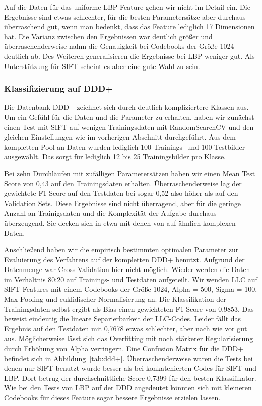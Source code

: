 Auf die Daten für das uniforme LBP-Feature gehen wir nicht im Detail ein. Die Ergebnisse sind etwas schlechter, für die besten Parametersätze aber durchaus überraschend gut, wenn man bedenkt, dass das Feature lediglich 17 Dimensionen hat. Die Varianz zwischen den Ergebnissen war deutlich größer und überraschenderweise nahm die Genauigkeit bei Codebooks der Größe 1024 deutlich ab. Des Weiteren generalisieren die Ergebnisse bei LBP weniger gut. Als Unterstützung für SIFT scheint es aber eine gute Wahl zu sein.

\subsubsection{Klassifizierung auf DDD+}

Die Datenbank DDD+ zeichnet sich durch deutlich kompliziertere Klassen aus. Um ein Gefühl für die Daten und die Parameter zu erhalten. haben wir zunächst einen Test mit SIFT auf wenigen Trainingsdaten mit RandomSearchCV und den gleichen Einstellungen wie im vorherigen Abschnitt durchgeführt. Aus dem kompletten Pool an Daten wurden lediglich 100 Trainings- und 100 Testbilder ausgewählt. Das sorgt für lediglich 12 bis 25 Trainingsbilder pro Klasse.

Bei zehn Durchläufen mit zufälligen Parametersätzen haben wir einen Mean Test Score von 0,43 auf den Trainingsdaten erhalten. Überraschenderweise lag der gewichtete F1-Score auf den Testdaten bei sogar 0,52 also höher als auf den Validation Sets. Diese Ergebnisse sind nicht überragend, aber für die geringe Anzahl an Trainigsdaten und die Komplexität der Aufgabe durchaus überzeugend. Sie decken sich in etwa mit denen von \cite{wyylhg10} auf ähnlich komplexen Daten.

Anschließend haben wir die empirisch bestimmten optimalen Parameter zur Evaluierung des Verfahrens auf der kompletten DDD+ benutzt. Aufgrund der Datenmenge war Cross Validation hier nicht möglich. Wieder werden die Daten im Verhältnis 80:20 auf Trainings- und Testdaten aufgeteilt. Wir wenden LLC auf SIFT-Features mit einem Codebooks der Größe 1024, Alpha = 500, Sigma = 100, Max-Pooling und euklidischer Normalisierung an. Die Klassifikation der Trainingsdaten selbst ergibt als Bias einen gewichteten F1-Score von 0,9853. Das beweist eindeutig die lineare Separierbarkeit der LLC-Codes. Leider fällt das Ergebnis auf den Testdaten mit 0,7678 etwas schlechter, aber nach wie vor gut aus. Möglicherweise lässt sich das Overfitting mit noch stärkerer Regularisierung durch Erhöhung von Alpha verringern. Eine Confusion Matrix für die DDD+ befindet sich in Abbildung~\ref{tab:ddd+}. Überraschenderweise waren die Tests bei denen nur SIFT benutzt wurde besser als bei konkatenierten Codes für SIFT und LBP. Dort betrug der durchschnittliche Score 0,7399 für den besten Klassifikator. Wie bei den Tests von LBP auf der DDD angedeutet könnten sich mit kleineren Codebooks für dieses Feature sogar bessere Ergebnisse erzielen lassen.

